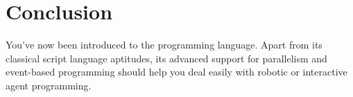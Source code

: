 \documentclass[openright,twoside,12pt]{report}
\begin{document}







\chapter{Conclusion}

You've now been introduced to the \urbi programming language. Apart
from its classical script language aptitudes, its advanced support for
parallelism and event-based programming should help you deal easily
with robotic or interactive agent programming.
\end{document}
